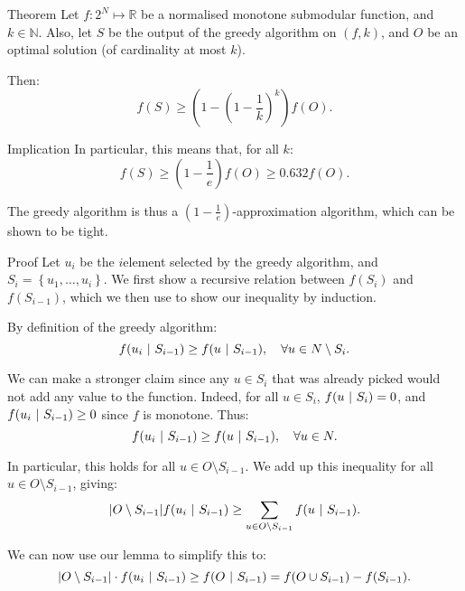 \documentclass[a4paper]{article}
\begin{document}
\begin{parag}{Theorem}
    Let $f: 2^N \mapsto \mathbb{R}$ be a normalised monotone submodular function, and $k \in \mathbb{N}$. Also, let $S$ be the output of the greedy algorithm on $\left(f, k\right)$, and $O$ be an optimal solution (of cardinality at most $k$).

    Then: 
    \[f\left(S\right) \geq \left(1 - \left(1 - \frac{1}{k}\right)^k\right) f\left(O\right).\]
    
    \begin{subparag}{Implication}
        In particular, this means that, for all $k$: 
        \[f\left(S\right) \geq \left(1 - \frac{1}{e}\right) f\left(O\right) \geq 0.632 f\left(O\right).\]

        The greedy algorithm is thus a $\left(1- \frac{1}{e}\right)$-approximation algorithm, which can be shown to be tight.
    \end{subparag}

    \begin{subparag}{Proof}
        Let $u_i$ be the $i$\Th element selected by the greedy algorithm, and $S_i = \left\{u_1, \ldots, u_i\right\}$. We first show a recursive relation between $f\left(S_i\right)$ and $f\left(S_{i-1}\right)$, which we then use to show our inequality by induction.

        By definition of the greedy algorithm: 
        \[f\left(u_i \suchthat S_{i-1}\right) \geq f\left(u \suchthat S_{i-1}\right), \mathspace \forall u \in N \setminus S_i.\]

        We can make a stronger claim since any $u \in S_i$ that was already picked would not add any value to the function. Indeed, for all $u \in S_i$, $f\left(u \suchthat S_i\right) = 0$, and $f\left(u_i \suchthat S_{i-1}\right) \geq 0$ since $f$ is monotone. Thus:
        \[f\left(u_i \suchthat S_{i-1}\right) \geq f\left(u \suchthat S_{i-1}\right), \mathspace \forall u \in N.\]

        In particular, this holds for all $u \in O \setminus S_{i-1}$. We add up this inequality for all $u \in O \setminus S_{i-1}$, giving: 
        \[\left|O \setminus S_{i-1}\right| f\left(u_i \suchthat S_{i-1}\right) \geq \sum_{u \in O \setminus S_{i-1}} f\left(u \suchthat S_{i-1}\right).\]
        
        We can now use our lemma to simplify this to:
        \[\left|O \setminus S_{i-1}\right|\cdot f\left(u_i \suchthat S_{i-1}\right) \geq f\left(O \suchthat S_{i-1}\right) = f\left(O \cup S_{i-1}\right) - f\left(S_{i-1}\right).\]


\end{subparag}
\end{parag}
\end{document}
